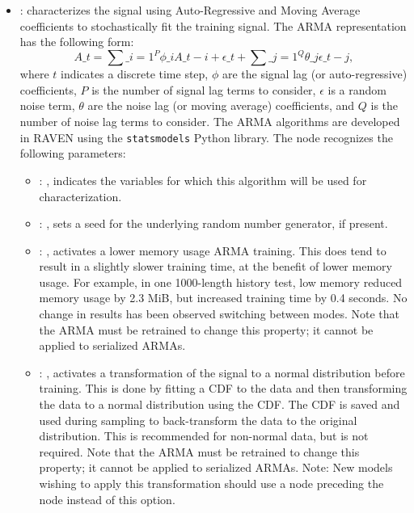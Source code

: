 \begin{itemize}
    \item {}:
      characterizes the signal using Auto-Regressive and Moving Average         coefficients to
      stochastically fit the training signal.         The ARMA representation has the following
      form:         \begin{equation*}           A\_t = \sum\_{i=1}^P \phi\_i A\_{t-i} + \epsilon\_t +
      \sum\_{j=1}^Q \theta\_j \epsilon\_{t-j},         \end{equation*}         where $t$ indicates a
      discrete time step, $\phi$ are the signal lag (or auto-regressive)         coefficients, $P$
      is the number of signal lag terms to consider, $\epsilon$ is a random noise         term,
      $\theta$ are the noise lag (or moving average) coefficients, and $Q$ is the number of
      noise lag terms to consider. The ARMA algorithms are developed in RAVEN using the
      \texttt{statsmodels} Python library.
      The  node recognizes the following parameters:
        \begin{itemize}
          \item {}: , 
            indicates the variables for which this algorithm will be used for characterization.
          \item {}: , 
            sets a seed for the underlying random number generator, if present.
          \item {}: , 
            activates a lower memory usage ARMA training. This does tend to result
            in a slightly slower training time, at the benefit of lower memory usage. For
            example, in one 1000-length history test, low memory reduced memory usage by 2.3
            MiB, but increased training time by 0.4 seconds. No change in results has been
            observed switching between modes. Note that the ARMA must be
            retrained to change this property; it cannot be applied to serialized ARMAs. 
          \item {}: , 
            activates a transformation of the signal to a normal distribution before
            training. This is done by fitting a CDF to the data and then transforming the
            data to a normal distribution using the CDF. The CDF is saved and used during
            sampling to back-transform the data to the original distribution. This is
            recommended for non-normal data, but is not required. Note that the ARMA must be
            retrained to change this property; it cannot be applied to serialized ARMAs.
            Note: New models wishing to apply this transformation should use a
             node preceding the  node instead of this
            option. 
      \end{itemize}


\end{itemize}
